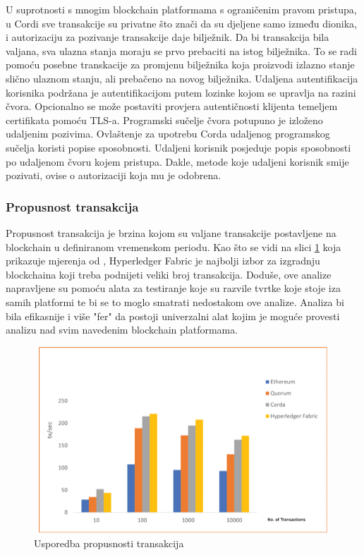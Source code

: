 \documentclass[times, utf8, diplomski]{fer}
\begin{document}
U suprotnosti s mnogim blockchain platformama s ograničenim pravom pristupa, u Cordi sve transakcije su privatne što znači da su djeljene samo između dionika, i autorizaciju za pozivanje transakcije daje bilježnik. Da bi transakcija bila valjana, sva ulazna stanja moraju se prvo prebaciti na istog bilježnika. To se radi pomoću posebne transkacije za promjenu bilježnika koja proizvodi izlazno stanje slično ulaznom stanju,  ali prebačeno na novog bilježnika. 
Udaljena autentifikacija korisnika podržana je autentifikacijom putem lozinke kojom se upravlja na razini čvora. Opcionalno se može postaviti provjera autentičnosti klijenta temeljem certifikata pomoću TLS-a. Programski sučelje čvora potupuno je izloženo udaljenim pozivima. Ovlaštenje za upotrebu Corda udaljenog programskog sučelja koristi popise sposobnosti. Udaljeni korisnik posjeduje popis sposobnosti po udaljenom čvoru kojem pristupa. Dakle, metode koje udaljeni korisnik smije pozivati, ovise o autorizaciji koja mu je odobrena.

\subsubsection{Propusnost transakcija}

Propusnost transakcija je brzina kojom su valjane transakcije postavljene na blockchain u definiranom vremenskom periodu. Kao što se vidi na slici \ref{fig:usporedba} koja prikazuje mjerenja od \citep{9411380}, Hyperledger Fabric je najbolji izbor za izgradnju blockchaina koji treba podnijeti veliki broj transakcija. Doduše, ove analize napravljene su pomoću alata za testiranje koje su razvile tvrtke koje stoje iza samih platformi te bi se to moglo smatrati nedostakom ove analize. Analiza bi bila efikasnije i više "fer" da postoji univerzalni alat kojim je moguće provesti analizu nad svim navedenim blockchain platformama.

\begin{figure}[htb]
\centering
\includegraphics[width=13cm, height=7cm]{imgs/monra10-CSDE92-large.png}
\caption{Usporedba propusnosti transakcija}
\label{fig:usporedba}
\end{figure}
\end{document}
